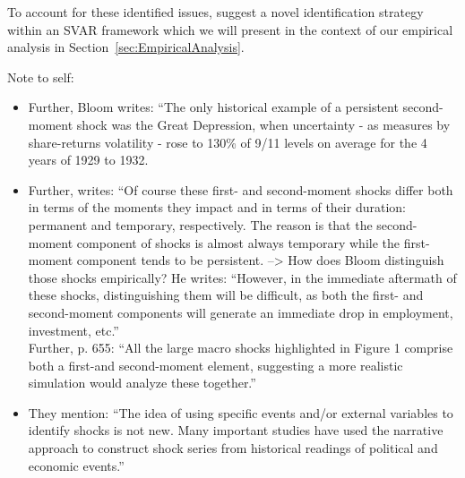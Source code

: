 \documentclass[a4paper,11pt,listof=nochaptergap,oneside,pointednumbers,bibtotoc,bigheadings,liststotoc]{scrbook}
\theoremstyle{mysatz}
\theoremstyle{mydefinition}
\theoremstyle{mybemerkung}
\begin{document}
To account for these identified issues, \citet{ludvigsonetal:18} suggest a novel identification strategy within an SVAR framework which we will present in the context of our empirical analysis in Section~\ref{sec:EmpiricalAnalysis}.



\begingroup
    \fontsize{8pt}{12pt}\selectfont
    Note to self:
\begin{itemize}
	\item Further, Bloom writes: ``The only historical example of a persistent second-moment shock was the Great Depression, when uncertainty - as measures by share-returns volatility - rose to 130\% of 9/11 levels on average for the 4 years of 1929 to 1932. 
	\item Further, \citet[p. 657]{bloom:09} writes: ``Of course these first- and second-moment shocks differ both in terms of the moments they impact and in terms of their duration: permanent and temporary, respectively. The reason is that the second-moment component of shocks is almost always temporary while the first-moment component tends to be persistent. --> How does Bloom distinguish those shocks empirically? He writes: ``However, in the immediate aftermath of these shocks, distinguishing them will be difficult, as both the first- and second-moment components will generate an immediate drop in employment, investment, etc.'' \\
Further, p. 655: ``All the large macro shocks highlighted in Figure 1 comprise both a first-and second-moment element, suggesting a more realistic simulation would analyze these together.''
	\item They mention: ``The idea of using specific events and/or external variables to identify shocks is not new. Many important studies have used the narrative approach to construct shock series from historical readings of political and economic events.''
\end{itemize}
\endgroup

\end{document}
